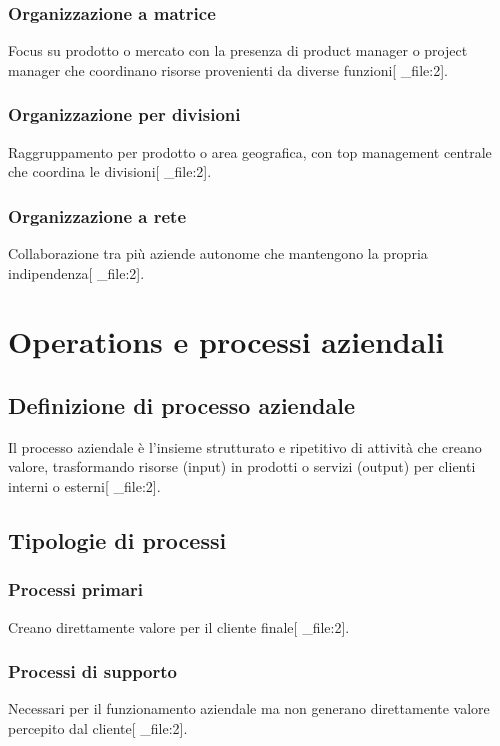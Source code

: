 \documentclass[12pt,a4paper]{article}
\begin{document}
\subsubsection{Organizzazione a matrice}
Focus su prodotto o mercato con la presenza di product manager o project manager che coordinano risorse provenienti da diverse funzioni[ _file:2].

\subsubsection{Organizzazione per divisioni}
Raggruppamento per prodotto o area geografica, con top management centrale che coordina le divisioni[ _file:2].

\subsubsection{Organizzazione a rete}
Collaborazione tra più aziende autonome che mantengono la propria indipendenza[ _file:2].

\section{Operations e processi aziendali}

\subsection{Definizione di processo aziendale}
Il processo aziendale è l'insieme strutturato e ripetitivo di attività che creano valore, trasformando risorse (input) in prodotti o servizi (output) per clienti interni o esterni[ _file:2].

\subsection{Tipologie di processi}

\subsubsection{Processi primari}
Creano direttamente valore per il cliente finale[ _file:2].

\subsubsection{Processi di supporto}
Necessari per il funzionamento aziendale ma non generano direttamente valore percepito dal cliente[ _file:2].
\end{document}
